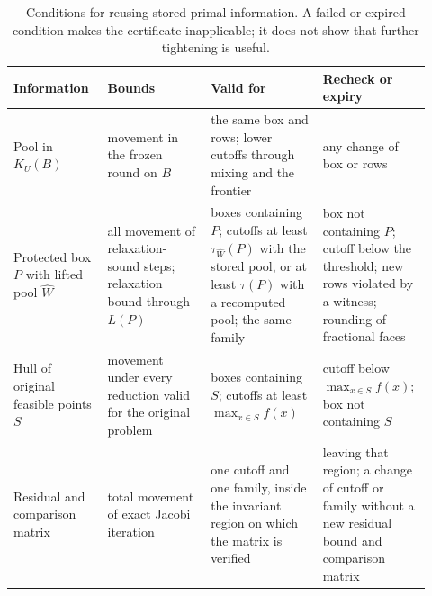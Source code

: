 \begin{table}[htbp]
\centering
\small
\begin{tabular}{@{}>{\raggedright\arraybackslash}p{0.2\linewidth}>{\raggedright\arraybackslash}p{0.23\linewidth}>{\raggedright\arraybackslash}p{0.25\linewidth}>{\raggedright\arraybackslash}p{0.24\linewidth}@{}}
\toprule
Information & Bounds & Valid for & Recheck or expiry\\
\midrule
Pool in $K_U(B)$ & movement in the frozen round on $B$ &
the same box and rows; lower cutoffs through mixing and the frontier &
any change of box or rows\\
\addlinespace
Protected box $P$ with lifted pool $\widehat W$ & all movement of
relaxation-sound steps; relaxation bound through $L(P)$ &
boxes containing $P$; cutoffs at least $\tau_{\widehat W}(P)$ with the
stored pool, or at least $\tau(P)$ with a recomputed pool; the same
family &
box not containing $P$; cutoff below the threshold; new rows violated by
a witness; rounding of fractional faces\\
\addlinespace
Hull of original feasible points $S$ & movement under every reduction
valid for the original problem & boxes containing $S$; cutoffs at least
$\max_{x\in S}f(x)$ & cutoff below $\max_{x\in S}f(x)$; box not
containing $S$\\
\addlinespace
Residual and comparison matrix & total movement of exact Jacobi
iteration & one cutoff and one family, inside the invariant region on
which the matrix is verified & leaving that region; a change of cutoff
or family without a new residual bound and comparison matrix\\
\bottomrule
\end{tabular}
\caption{Conditions for reusing stored primal information. A failed or
expired condition makes the certificate inapplicable; it does not show
that further tightening is useful.}\label{tab:reuse}
\end{table}
